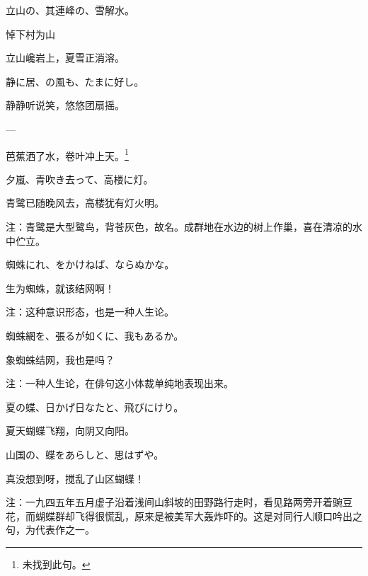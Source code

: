 \begin{haiku}
    {\FH 立山の、其連峰の、雪解水。}

    {\FK 悼下村为山}

    {\FK 立山巉岩上，夏雪正消溶。}
\end{haiku}

\begin{haiku}
    {\FH 静に居、の風も、たまに好し。}

    {\FK 静静听说笑，悠悠团扇摇。}
\end{haiku}

\begin{haiku}
    {\FH ---}

    {\FK 芭蕉洒了水，卷叶冲上天。\footnote{\FT 未找到此句。}}
\end{haiku}

\begin{haiku}
    {\FH 夕嵐、青吹き去って、高楼に灯。}

    {\FK 青鹭已随晚风去，高楼犹有灯火明。}

    {\FT 注：青鹭是大型鹭鸟，背苍灰色，故名。成群地在水边的树上作巢，喜在清凉的水中伫立。}
\end{haiku}

\begin{haiku}
    {\FH 蜘蛛にれ、をかけねば、ならぬかな。}

    {\FK 生为蜘蛛，就该结网啊！}

    {\FT 注：这种意识形态，也是一种人生论。}
\end{haiku}

\begin{haiku}
    {\FH 蜘蛛網を、張るが如くに、我もあるか。}

    {\FK 象蜘蛛结网，我也是吗？}

    {\FT 注：一种人生论，在俳句这小体裁单纯地表现出来。}
\end{haiku}

\begin{haiku}
    {\FH 夏の蝶、日かげ日なたと、飛びにけり。}

    {\FK 夏天蝴蝶飞翔，向阴又向阳。}
\end{haiku}

\begin{haiku}
    {\FH 山国の、蝶をあらしと、思はずや。}

    {\FK 真没想到呀，搅乱了山区蝴蝶！}

    {\FT 注：一九四五年五月虚子沿着浅间山斜坡的田野路行走时，看见路两旁开着豌豆花，而蝴蝶群却飞得很慌乱，原来是被美军大轰炸吓的。这是对同行人顺口吟出之句，为代表作之一。}
\end{haiku}

